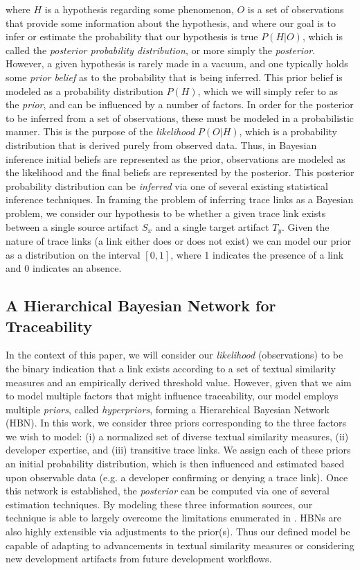 \noindent where $H$ is a hypothesis regarding some phenomenon, $O$ is a set of observations that provide some information about the hypothesis, and where our goal is to infer or estimate the probability that our hypothesis is true $P(H|O)$, which is called the \textit{posterior probability distribution}, or more simply the \textit{posterior}. However, a given hypothesis is rarely made in a vacuum, and one typically holds some \textit{prior belief} as to the probability that is being inferred.  This prior belief is modeled as a probability distribution $P(H)$, which we will simply refer to as the \textit{prior}, and can be influenced by a number of factors. In order for the posterior to be inferred from a set of observations, these must be modeled in a probabilistic manner. This is the purpose of the \textit{likelihood} $P(O|H)$, which is a probability distribution that is derived purely from observed data. Thus, in Bayesian inference initial beliefs are represented as the prior, observations are modeled as the likelihood and the final beliefs are represented by the posterior. This posterior probability distribution can be \textit{inferred} via one of several existing statistical inference techniques. In framing the problem of inferring trace links as a Bayesian problem, we consider our hypothesis to be whether a given trace link exists between a single source artifact $S_x$ and a single target artifact $T_y$. Given the nature of trace links (\eg a link either does or does not exist) we can model our prior as a distribution on the interval $[0,1]$, where 1 indicates the presence of a link and 0 indicates an absence. 

\subsection{A Hierarchical Bayesian Network for Traceability}

In the context of this paper, we will consider our \textit{likelihood} (observations) to be the binary indication that a link exists according to a set of textual similarity measures and an empirically derived threshold value. However, given that we aim to model multiple factors that might influence traceability, our model employs multiple \textit{priors}, called \textit{hyperpriors}, forming a Hierarchical Bayesian Network (HBN). In this work, we consider three priors corresponding to the three factors we wish to model: (i) a normalized set of diverse textual similarity measures, (ii) developer expertise, and (iii) transitive trace links. We assign each of these priors an initial probability distribution, which is then influenced and estimated based upon observable data (e.g. a developer confirming or denying a trace link). Once this network is established, the \textit{posterior} can be computed via one of several estimation techniques. By modeling these three information sources, our technique is able to largely overcome the limitations enumerated in  . HBNs are also highly extensible via adjustments to the prior(s). Thus our defined model be capable of adapting to advancements in textual similarity measures or considering new development artifacts from future development workflows.